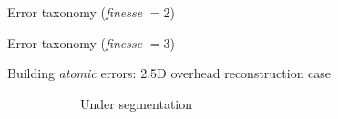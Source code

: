 \documentclass[export]{beamer}
\begin{document}
            \begin{frame}{Error taxonomy (\textit{finesse} $= 2$)}
                \begin{figure}
                    
                \end{figure}
            \end{frame}
            \begin{frame}{Error taxonomy (\textit{finesse} $= 3$)}
                \begin{figure}
                    
                \end{figure}
            \end{frame}
            \begin{frame}{Building \textit{atomic} errors: 2.5D overhead reconstruction case}
                \begin{figure}
                    \begin{center}
                        \begin{subfigure}{.28\textwidth}
                            \caption{\label{fig::bul_under} Under segmentation}
                        \end{subfigure}
                        \hspace{10pt}
                        \begin{subfigure}{.28\textwidth}

\end{subfigure}
\end{center}
\end{figure}
\end{frame}
\end{document}
